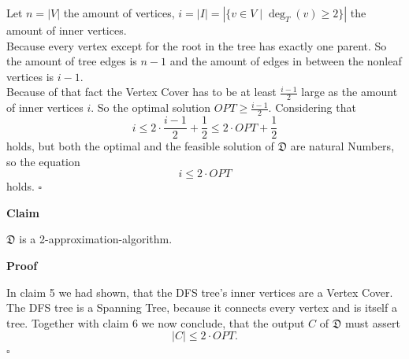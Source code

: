 \documentclass[11pt,a4paper,ngerman]{article}
\newcommand{\claim}{\addtocounter{claims}{1} \bfseries Claim \arabic{claims}}
\newcommand{\proof}{\bfseries Proof}
\begin{document}
\begin{description}
Let $n =|V|$ the amount of vertices, $i = |I| = \left| \{ v \in V \; | \; \deg_T(v) \geq 2 \} \right|$ the amount of inner vertices.\\

Because every vertex except for the root in the tree has exactly one parent. So the amount of tree edges is $n-1$ and the amount of edges in between the nonleaf vertices is $i-1$.\\

Because of that fact the Vertex Cover has to be at least $\frac{i-1}{2}$ large as the amount of inner vertices $i$. So the optimal solution $OPT \geq \frac{i-1}{2}$.
Considering that
$$i \leq 2 \cdot \frac{i - 1}{2} + \frac{1}{2} \leq 2 \cdot OPT + \frac{1}{2}$$ holds, 
but both the optimal and the feasible solution of $\mathfrak{D}$ are natural Numbers, so the equation
$$
i \leq 2 \cdot OPT
$$
holds.\mbox{} \hfill $\square$

	\item{\claim} $\mathfrak{D}$ is a 2-approximation-algorithm.
	\item{\proof}

In claim 5 we had shown, that the DFS tree's inner vertices are a Vertex Cover. The DFS tree is a Spanning Tree, because it connects every vertex and is itself a tree. Together with claim 6 we now conclude, that the output $C$ of $\mathfrak{D}$ must assert
$$
|C| \leq 2 \cdot OPT.
$$
\mbox{}\hfill $\square$
\end{description}

\label{LastPage}
\end{document}
